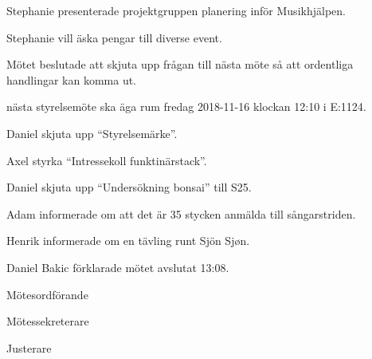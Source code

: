 \documentclass[10pt]{article}
\def\mo{Daniel Bakic}
\def\ms{Axel Voss}
\def\ji{Adam Belfrage}
\begin{document}
\begin{paragrafer}

	Stephanie presenterade projektgruppen planering inför Musikhjälpen.

	Stephanie vill äska pengar till diverse event.

	Mötet beslutade att skjuta upp frågan till nästa möte så att ordentliga handlingar kan komma ut.


	\Mba nästa styrelsemöte ska äga rum fredag 2018-11-16 klockan 12:10 i E:1124.


	Daniel \ypa skjuta upp ``Styrelsemärke''.

	\Mbaby

	Axel \ypa styrka ``Intressekoll funktinärstack''.

	\Mbaby

	Daniel \ypa skjuta upp ``Undersökning bonsai'' till S25.

	\Mbaby

	\newpage

	Adam informerade om att det är 35 stycken anmälda till sångarstriden.

	Henrik informerade om en tävling runt Sjön Sjøn.

	
	{\mo} förklarade mötet avslutat 13:08.

\end{paragrafer}

\hidesignfoot
\begin{signatures}{3}
	\signature{\mo}{Mötesordförande}
	\signature{\ms}{Mötessekreterare}
	\signature{\ji}{Justerare}
\end{signatures}
\end{document}
